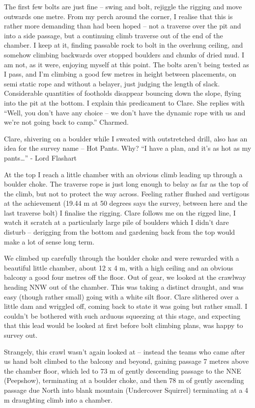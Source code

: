 The first few bolts are just fine -- swing and bolt, rejiggle the
rigging and move outwards one metre. From my perch around the corner, I
realise that this is rather more demanding than had been hoped -- not a
traverse over the pit and into a side passage, but a continuing climb
traverse out of the end of the chamber. I keep at it, finding passable
rock to bolt in the overhung ceiling, and somehow climbing backwards
over stopped boulders and chunks of dried mud. I am not, as it were,
enjoying myself at this point. The bolts aren't being tested as I pass,
and I'm climbing a good few metres in height between placements, on semi
static rope and without a belayer, just judging the length of slack.
Considerable quantities of footholds disappear bouncing down the slope,
flying into the pit at the bottom. I explain this predicament to Clare.
She replies with ``Well, you don't have any choice -- we don't have the
dynamic rope with us and we're not going back to camp.'' Charmed.

Clare, shivering on a boulder while I sweated with outstretched drill,
also has an idea for the survey name -- Hot Pants. Why? ``I have a plan,
and it's as hot as my pants\ldots{}'' - Lord Flashart

At the top I reach a little chamber with an obvious climb leading up
through a boulder choke. The traverse rope is just long enough to belay
as far as the top of the climb, but not to protect the way across.
Feeling rather flushed and vertigous at the achievement (19.44 m at 50
degrees says the survey, between here and the last traverse bolt) I
finalise the rigging. Clare follows me on the rigged line, I watch it
scratch at a particularly large pile of boulders which I didn't dare
disturb -- derigging from the bottom and gardening back from the top
would make a lot of sense long term.

We climbed up carefully through the boulder choke and were rewarded with
a beautiful little chamber, about 12 x 4 m, with a high ceiling and an
obvious balcony a good four metres off the floor. Out of gear, we looked
at the crawlway heading NNW out of the chamber. This was taking a
distinct draught, and was easy (though rather small) going with a white
silt floor. Clare slithered over a little dam and wriggled off, coming
back to state it was going but rather small. I couldn't be bothered with
such arduous squeezing at this stage, and expecting that this lead would
be looked at first before bolt climbing plans, was happy to survey out.

Strangely, this crawl wasn't again looked at -- instead the teams who
came after us hand bolt climbed to the balcony and beyond, gaining
passage 7 metres above the chamber floor, which led to 73 m of gently
descending passage to the NNE (Peepshow), terminating at a boulder
choke, and then 78 m of gently ascending passage due North into blank
mountain (Undercover Squirrel) terminating at a 4 m draughting climb
into a chamber.

